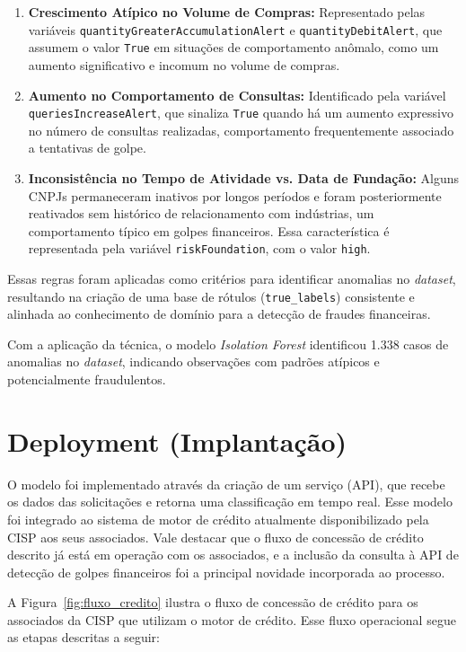 \documentclass[12pt,a4paper]{article}
\begin{document}
\begin{enumerate}
    \item \textbf{Crescimento Atípico no Volume de Compras:} Representado pelas variáveis \texttt{quantityGreaterAccumulationAlert} e \texttt{quantityDebitAlert}, que assumem o valor \texttt{True} em situações de comportamento anômalo, como um aumento significativo e incomum no volume de compras.

    \item \textbf{Aumento no Comportamento de Consultas:} Identificado pela variável \texttt{queriesIncreaseAlert}, que sinaliza \texttt{True} quando há um aumento expressivo no número de consultas realizadas, comportamento frequentemente associado a tentativas de golpe.

    \item \textbf{Inconsistência no Tempo de Atividade vs. Data de Fundação:} Alguns CNPJs permaneceram inativos por longos períodos e foram posteriormente reativados sem histórico de relacionamento com indústrias, um comportamento típico em golpes financeiros. Essa característica é representada pela variável \texttt{riskFoundation}, com o valor \texttt{high}.
\end{enumerate}

Essas regras foram aplicadas como critérios para identificar anomalias no \textit{dataset}, resultando na criação de uma base de rótulos (\texttt{true\_labels}) consistente e alinhada ao conhecimento de domínio para a detecção de fraudes financeiras.

Com a aplicação da técnica, o modelo \textit{Isolation Forest} identificou 1.338 casos de anomalias no \textit{dataset}, indicando observações com padrões atípicos e potencialmente fraudulentos.

\section{Deployment (Implantação)}

O modelo foi implementado através da criação de um serviço (API), que recebe os dados das solicitações e retorna uma classificação em tempo real. Esse modelo foi integrado ao sistema de motor de crédito atualmente disponibilizado pela CISP aos seus associados. Vale destacar que o fluxo de concessão de crédito descrito já está em operação com os associados, e a inclusão da consulta à API de detecção de golpes financeiros foi a principal novidade incorporada ao processo.

A Figura~\ref{fig:fluxo_credito} ilustra o fluxo de concessão de crédito para os associados da CISP que utilizam o motor de crédito. Esse fluxo operacional segue as etapas descritas a seguir:
\end{document}
